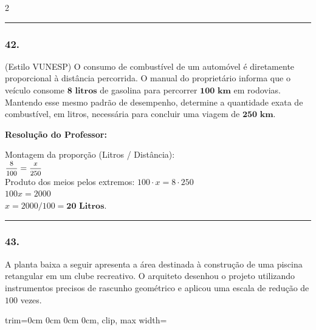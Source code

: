 \begin{multicols*}{2}
\noindent\textcolor{CorLinha}{\rule{\linewidth}{0.5pt}} 
\par\vspace{\espacoPreQuestao}
\subsubsection*{42.} (Estilo VUNESP) O consumo de combustível de um automóvel é diretamente proporcional à distância percorrida. O manual do proprietário informa que o veículo consome $ \textbf{8 litros} $ de gasolina para percorrer $ \textbf{100 km} $ em rodovias. Mantendo esse mesmo padrão de desempenho, determine a quantidade exata de combustível, em litros, necessária para concluir uma viagem de $ \textbf{250 km} $.

\ifgabarito
    \begin{tcolorbox}[colback=CorTitUm!5, colframe=CorTitUm, boxrule=1pt, arc=4pt, left=6pt, right=6pt, top=6pt, bottom=6pt]
    \small\textbf{\textcolor{CorTitUm}{Resolução do Professor:}}\par\vspace{0.1cm}
    \color{CinzaEscuro}
    Montagem da proporção (Litros / Distância):\\
    $ \mfrac{8}{100} = \mfrac{x}{250} $\\
    Produto dos meios pelos extremos: $ 100 \cdot x = 8 \cdot 250 $\\
    $ 100x = 2000 $\\
    $ x = 2000 / 100 = \textbf{20 Litros} $.
    \end{tcolorbox}
\fi

\par\vspace{\espacoQuestao}

\noindent\textcolor{CorLinha}{\rule{\linewidth}{0.5pt}} 
\par\vspace{\espacoPreQuestao}
\subsubsection*{43.} A planta baixa a seguir apresenta a área destinada à construção de uma piscina retangular em um clube recreativo. O arquiteto desenhou o projeto utilizando instrumentos precisos de rascunho geométrico e aplicou uma escala de redução de $ 100 $ vezes.
\begin{center}
\begin{adjustbox}{trim=0cm 0cm 0cm 0cm, clip, max width=\larguraTikz}
\end{adjustbox}
\end{center}
\end{multicols*}
